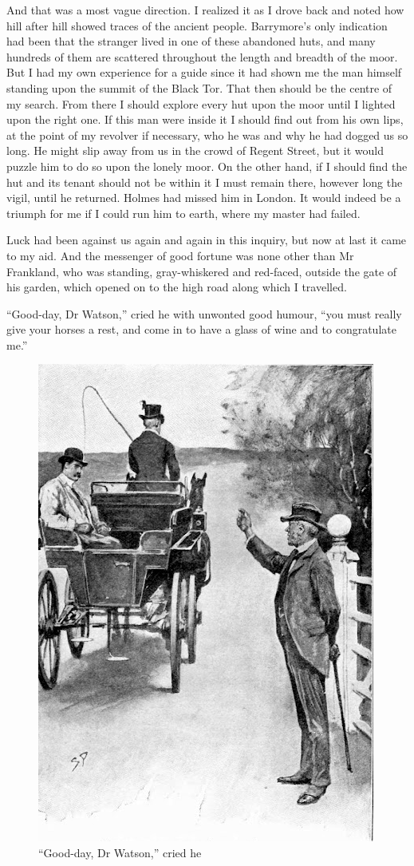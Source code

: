 \documentclass[paper=5.5in:8.5in,BCOR=7mm,twoside,DIV=calc,12pt,usegeometry,openany,chapterprefix,endperiod]{scrbook} %
\begin{document}
And that was a most vague direction. I realized it as I drove back and noted how hill after hill showed traces of the ancient people. Barrymore's only indication had been that the stranger lived in one of these abandoned huts, and many hundreds of them are scattered throughout the length and breadth of the moor. But I had my own experience for a guide since it had shown me the man himself standing upon the summit of the Black Tor. That then should be the centre of my search. From there I should explore every hut upon the moor until I lighted upon the right one. If this man were inside it I should find out from his own lips, at the point of my revolver if necessary, who he was and why he had dogged us so long. He might slip away from us in the crowd of Regent Street, but it would puzzle him to do so upon the lonely moor. On the other hand, if I should find the hut and its tenant should not be within it I must remain there, however long the vigil, until he returned. Holmes had missed him in London. It would indeed be a triumph for me if I could run him to earth, where my master had failed.

Luck had been against us again and again in this inquiry, but now at last it came to my aid. And the messenger of good fortune was none other than Mr Frankland, who was standing, gray-whiskered and red-faced, outside the gate of his garden, which opened on to the high road along which I travelled.

\enquote{Good-day, Dr Watson,} cried he with unwonted good humour, \enquote{you must really give your horses a rest, and come in to have a glass of wine and to congratulate me.}

\begin{figure}
\centering
\includegraphics[width=.6\linewidth]{11_goodday}
\caption{\enquote{Good-day, Dr Watson,} cried he}
\end{figure}
\end{document}
